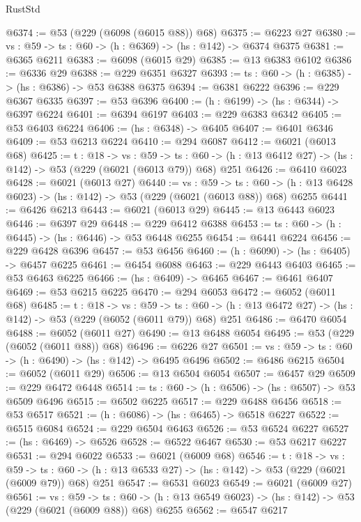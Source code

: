 \begin{lexlean}{RustStd}
\begin{coremodule}
@6374 := @53 (@229 (@6098 (@6015 @88)) @68)
@6375 := @6223 @27
@6380 := {vs : @59} -> {ts : @60} -> (h : @6369) -> (hs : @142) -> @6374 @6375
@6381 := @6365 @6211
@6383 := @6098 (@6015 @29)
@6385 := @13 @6383 @6102
@6386 := @6336 @29
@6388 := @229 @6351 @6327
@6393 := {ts : @60} -> (h : @6385) -> (hs : @6386) -> @53 @6388 @6375
@6394 := @6381 @6222
@6396 := @229 @6367 @6335
@6397 := @53 @6396
@6400 := (h : @6199) -> (hs : @6344) -> @6397 @6224
@6401 := @6394 @6197
@6403 := @229 @6383 @6342
@6405 := @53 @6403 @6224
@6406 := (hs : @6348) -> @6405
@6407 := @6401 @6346
@6409 := @53 @6213 @6224
@6410 := @294 @6087
@6412 := @6021 (@6013 @68)
@6425 := {t : @18} ->
  {vs : @59} ->
  {ts : @60} -> (h : @13 @6412 @27) -> (hs : @142) -> @53 (@229 (@6021 (@6013 @79)) @68) @251
@6426 := @6410 @6023
@6428 := @6021 (@6013 @27)
@6440 := {vs : @59} ->
  {ts : @60} -> (h : @13 @6428 @6023) -> (hs : @142) -> @53 (@229 (@6021 (@6013 @88)) @68) @6255
@6441 := @6426 @6213
@6443 := @6021 (@6013 @29)
@6445 := @13 @6443 @6023
@6446 := @6397 @29
@6448 := @229 @6412 @6388
@6453 := {ts : @60} -> (h : @6445) -> (hs : @6446) -> @53 @6448 @6255
@6454 := @6441 @6224
@6456 := @229 @6428 @6396
@6457 := @53 @6456
@6460 := (h : @6090) -> (hs : @6405) -> @6457 @6225
@6461 := @6454 @6088
@6463 := @229 @6443 @6403
@6465 := @53 @6463 @6225
@6466 := (hs : @6409) -> @6465
@6467 := @6461 @6407
@6469 := @53 @6215 @6225
@6470 := @294 @6053
@6472 := @6052 (@6011 @68)
@6485 := {t : @18} ->
  {vs : @59} ->
  {ts : @60} -> (h : @13 @6472 @27) -> (hs : @142) -> @53 (@229 (@6052 (@6011 @79)) @68) @251
@6486 := @6470 @6054
@6488 := @6052 (@6011 @27)
@6490 := @13 @6488 @6054
@6495 := @53 (@229 (@6052 (@6011 @88)) @68)
@6496 := @6226 @27
@6501 := {vs : @59} -> {ts : @60} -> (h : @6490) -> (hs : @142) -> @6495 @6496
@6502 := @6486 @6215
@6504 := @6052 (@6011 @29)
@6506 := @13 @6504 @6054
@6507 := @6457 @29
@6509 := @229 @6472 @6448
@6514 := {ts : @60} -> (h : @6506) -> (hs : @6507) -> @53 @6509 @6496
@6515 := @6502 @6225
@6517 := @229 @6488 @6456
@6518 := @53 @6517
@6521 := (h : @6086) -> (hs : @6465) -> @6518 @6227
@6522 := @6515 @6084
@6524 := @229 @6504 @6463
@6526 := @53 @6524 @6227
@6527 := (hs : @6469) -> @6526
@6528 := @6522 @6467
@6530 := @53 @6217 @6227
@6531 := @294 @6022
@6533 := @6021 (@6009 @68)
@6546 := {t : @18} ->
  {vs : @59} ->
  {ts : @60} -> (h : @13 @6533 @27) -> (hs : @142) -> @53 (@229 (@6021 (@6009 @79)) @68) @251
@6547 := @6531 @6023
@6549 := @6021 (@6009 @27)
@6561 := {vs : @59} ->
  {ts : @60} -> (h : @13 @6549 @6023) -> (hs : @142) -> @53 (@229 (@6021 (@6009 @88)) @68) @6255
@6562 := @6547 @6217

\end{coremodule}
\end{lexlean}
